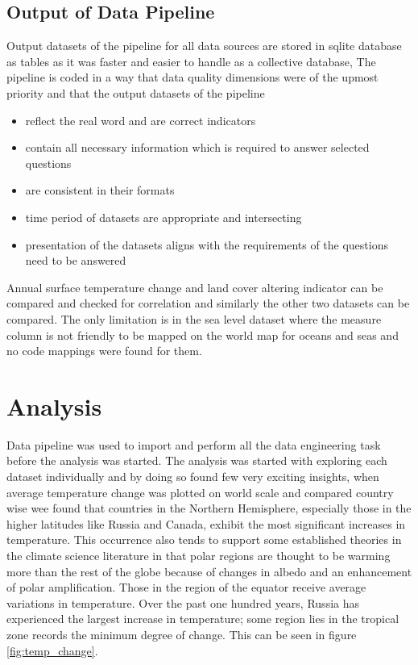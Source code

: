 \documentclass[a4paper,11pt]{article}
\begin{document}
\subsection{Output of Data Pipeline}
Output datasets of the pipeline for all data sources are stored in sqlite database as tables as it was faster and easier to handle as a collective database, The pipeline is coded in a way that data quality dimensions were of the upmost priority and that the output datasets of the pipeline 
\begin{itemize}
    \item reflect the real word and are correct indicators
    \item contain all necessary information which is required to answer selected questions
    \item are consistent in their formats
    \item time period of datasets are appropriate and intersecting
    \item presentation of the datasets aligns with the requirements of the questions need to be answered
\end{itemize}

Annual surface temperature change and land cover altering indicator can be compared and checked for correlation and similarly the other two datasets can be compared. The only limitation is in the sea level dataset where the measure column is not friendly to be mapped on the world map for oceans and seas and no code mappings were found for them.

\section{Analysis}

Data pipeline was used to import and perform all the data engineering task before the analysis was started. The analysis was started with exploring each dataset individually and by doing so found few very exciting insights, when average temperature change was plotted on world scale and compared country wise wee found that countries in the Northern Hemisphere, especially those in the higher latitudes like Russia and Canada, exhibit the most significant increases in temperature. This occurrence also tends to support some established theories in the climate science literature in that polar regions are thought to be warming more than the rest of the globe because of changes in albedo and an enhancement of polar amplification. Those in the region of the equator receive average variations in temperature. Over the past one hundred years, Russia has experienced the largest increase in temperature; some region lies in the tropical zone records the minimum degree of change. This can be seen in figure \ref{fig:temp_change}.
\end{document}
